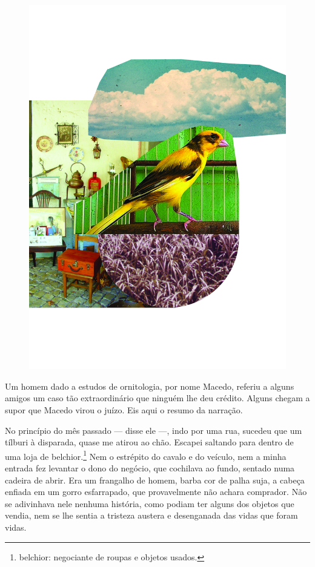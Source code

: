 \pagebreak
\thispagestyle{empty}
\begin{figure}
\includegraphics[width=\textwidth]{./ilustracoes/17_CANARIO.jpg}
\end{figure}
\pagebreak


\noindent{}Um homem dado a estudos de ornitologia, por nome Macedo, referiu a
alguns amigos um caso tão extraordinário que ninguém lhe deu crédito.
Alguns chegam a supor que Macedo virou o juízo. Eis aqui o resumo da
narração.

No princípio do mês passado --- disse ele ---, indo por uma rua, sucedeu
que um tílburi à disparada, quase me atirou ao chão. Escapei saltando
para dentro de uma loja de belchior.\footnote{belchior: negociante de
  roupas e objetos usados.} Nem o estrépito do cavalo e do veículo, nem
a minha entrada fez levantar o dono do negócio, que cochilava ao fundo,
sentado numa cadeira de abrir. Era um frangalho de homem, barba cor de
palha suja, a cabeça enfiada em um gorro esfarrapado, que provavelmente
não achara comprador. Não se adivinhava nele nenhuma história, como
podiam ter alguns dos objetos que vendia, nem se lhe sentia a tristeza
austera e desenganada das vidas que foram vidas.

